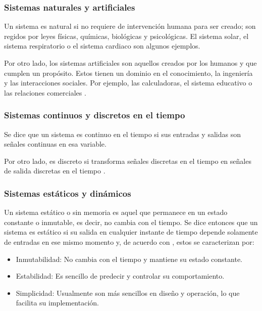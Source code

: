 \subsubsection{Sistemas naturales y artificiales}

Un sistema es natural si no requiere de intervención humana para ser creado; son regidos por leyes físicas, químicas, biológicas y psicológicas. El sistema solar, el sistema respiratorio o el sistema cardiaco son algunos ejemplos. 

Por otro lado, los sistemas artificiales son aquellos creados por los humanos y que cumplen un propósito. Estos tienen un dominio en el conocimiento, la ingeniería y las interacciones sociales. Por ejemplo, las calculadoras, el sistema educativo o las relaciones comerciales \cite{natural_artificial}.

\subsubsection{Sistemas continuos y discretos en el tiempo}

Se dice que un sistema es continuo en el tiempo si sus entradas y salidas son señales continuas en esa variable.

Por otro lado, es discreto si transforma señales discretas en el tiempo en señales de salida discretas en el tiempo \cite{continuo_discreto}.

\subsubsection{Sistemas estáticos y dinámicos}

Un sistema estático o sin memoria es aquel que permanece en un estado constante o inmutable, es decir, no cambia con el tiempo. Se dice entonces que un sistema es estático si su salida en cualquier instante de tiempo depende solamente de entradas en ese mismo momento y, de acuerdo con \cite{estatico_dinamico}, estos se caracterizan por:

\begin{itemize}
	
	\item Inmutabilidad: No cambia con el tiempo y mantiene su estado constante.
	
	\item Estabilidad: Es sencillo de predecir y controlar su comportamiento.
	
	\item Simplicidad: Usualmente son más sencillos en diseño y operación, lo que facilita su implementación. 
	
\end{itemize} 

